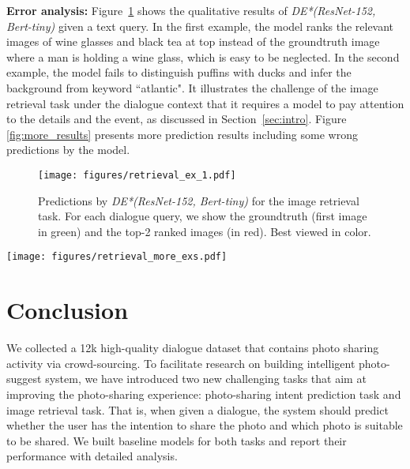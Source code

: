 \documentclass[11pt,a4paper]{article}
\begin{document}
\textbf{Error analysis:} Figure~\ref{fig:retrieval_ex} shows the qualitative results of \textit{DE*(ResNet-152,  Bert-tiny)} given a text query. In the first example, the model ranks the relevant images of wine glasses and black tea at top instead of the groundtruth image where a man is holding a wine glass, which is easy to be neglected. In the second example, the model fails to distinguish puffins with ducks and infer the background from keyword ``atlantic". It illustrates the challenge of the image retrieval task under the dialogue context that it requires a model to pay attention to the details and the event, as discussed in Section~\ref{sec:intro}. Figure \ref{fig:more_results} presents more prediction results including some wrong predictions by the model.




\begin{figure}[t]
  \centering
  \texttt{[image: figures/retrieval\_ex\_1.pdf]}
\caption{Predictions by \textit{DE*(ResNet-152, Bert-tiny)} for the image retrieval task. For each dialogue query, we show the groundtruth (first image in green) and the top-2 ranked images (in red). Best viewed in color.}
  \label{fig:retrieval_ex}
  \vspace{-5mm}
\end{figure}

\begin{figure*}[h!]
  \centering
  \texttt{[image: figures/retrieval\_more\_exs.pdf]}
    \vspace{-5mm}
\caption{Predictions by \textit{DE*(ResNet-152, Bert-tiny)} for the image retrieval task. For each dialogue query, we show the top-5 ranked images from left to right. The ground-truth image is marked in green while the others are in red. Best viewed in color.}
    \label{fig:more_results}
    \vspace{-5mm}
\end{figure*}










\section{Conclusion}
We collected a 12k high-quality dialogue dataset that contains photo sharing activity via crowd-sourcing. To facilitate research on building intelligent photo-suggest system, we have introduced two new challenging tasks that aim at improving the photo-sharing experience: photo-sharing intent prediction task and image retrieval task. That is, when given a dialogue, the system should predict whether the user has the intention to share the photo and which photo is suitable to be shared. We built baseline models for both tasks and report their performance with detailed analysis. 
\end{document}
